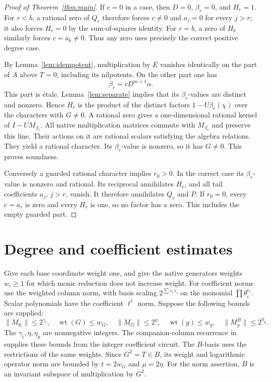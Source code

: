 \documentclass[11pt,a4paper]{article}
\begin{document}
\begin{proof}[Proof of Theorem~\ref{thm:main}]
If $c=0$ in a case, then $D=0$, $\beta_r=0$, and $H_r=1$.
For $r<b$, a rational zero of $Q_r$ therefore forces $c\ne0$
and $a_j=0$ for every $j>r$; it also forces $H_r=0$ by the
sum-of-squares identity. For $r=b$, a zero of $H_b$ similarly
forces $c=a_b\ne0$. Thus any zero uses precisely the correct
positive degree case.

By Lemma~\ref{lem:idempotent}, multiplication by $E$ vanishes
identically on the part of $A$ above $T=0$, including its
nilpotents. On the other part one has
\[
                         \beta_r=cD^{m+1}\alpha.
\]
This part is \'etale. Lemma~\ref{lem:separate} implies that its
$\beta_r$-values are distinct and nonzero. Hence $H_r$ is the
product of the distinct factors $1-U\beta_r(\chi)$ over the
characters with $G\ne0$. A rational zero gives a one-dimensional
rational kernel of $I-UM_{\beta_r}$. All native multiplication
matrices commute with $M_{\beta_r}$ and preserve this line.
Their actions on it are rational scalars satisfying the algebra
relations. They yield a rational character. Its $\beta_r$-value
is nonzero, so it has $G\ne0$. This proves soundness.

Conversely a guarded rational character implies $r_0>0$.
In the correct case its $\beta_r$-value is nonzero and rational.
Its reciprocal annihilates $H_r$, and all tail coefficients
$a_j$, $j>r$, vanish. It therefore annihilates $Q_r$ and $P$.
If $r_0=0$, every $c=a_r$ is zero and every $H_r$ is one,
so no factor has a zero. This includes the empty guarded part.
\end{proof}

\section{Degree and coefficient estimates}

Give each base coordinate weight one, and give the native generators
weights $w_i\ge1$ for which monic reduction does not increase
weight. For coefficient norms use the weighted column norm,
with basis scaling $2^{\sum e_i\gamma_i}$ on the monomial
$\prod\theta_i^{e_i}$. Scalar polynomials have the coefficient
$\ell^1$ norm. Suppose the following bounds are supplied:
\[
 \|M_{\theta_i}\|\le2^{\gamma_i},\quad
 \operatorname{wt}(G)\le w_G,\quad \|M_G\|\le2^\eta,
 \quad \operatorname{wt}(g)\le w_g,\quad\|M_g^B\|\le2^{\eta_g}.
\]
The $\gamma_i,\eta,\eta_g$ are nonnegative integers. The
companion-column recurrence in~\cite{Weighted} supplies these
bounds from the integer coefficient circuit. The $B$-basis uses
the restrictions of the same weights. Since $G^2=T\in B$, its
weight and logarithmic operator norm are bounded by
$t=2w_G$ and $\mu=2\eta$. For the norm assertion, $B$ is an
invariant subspace of multiplication by $G^2$.
\end{document}
